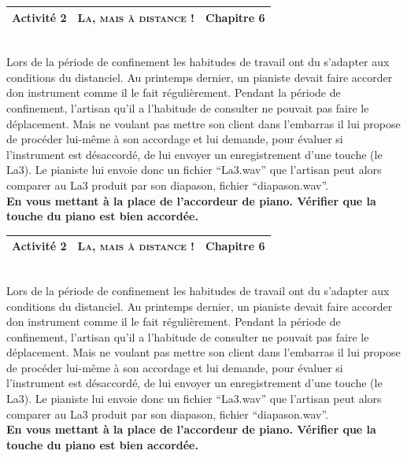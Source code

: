 \documentclass[a4paper,12pt,fleqn]{article}%
\begin{document}
\begin{tabular}{|>{\centering}m{5cm}|>{\centering}m{8cm}|>{\centering\arraybackslash}m{4cm}|}
		\hline
		Activité 2 & \textbf{\textsc{La, mais à distance !}} &  Chapitre 6 \\
		\hline
\end{tabular}\\

Lors de la période de confinement les habitudes de travail ont du s'adapter aux conditions du distanciel. Au printemps dernier, un pianiste devait faire accorder don instrument comme il le fait régulièrement. Pendant la période de confinement, l’artisan qu’il a l’habitude de consulter ne pouvait pas faire le déplacement. Mais ne voulant pas mettre son client dans l’embarras il lui propose de procéder lui-même à son accordage et lui demande, pour évaluer si l’instrument est désaccordé, de lui envoyer un enregistrement d’une touche (le La3). Le pianiste lui envoie donc un fichier “La3.wav” que l’artisan peut alors comparer au La3 produit par son diapason, fichier “diapason.wav”.\\
\textbf{En vous mettant à la place de l’accordeur de piano. Vérifier que la touche du piano est bien accordée.}\\
\vspace{1em}

\begin{tabular}{|>{\centering}m{5cm}|>{\centering}m{8cm}|>{\centering\arraybackslash}m{4cm}|}
		\hline
		Activité 2 & \textbf{\textsc{La, mais à distance !}} &  Chapitre 6 \\
		\hline
\end{tabular}\\

%
Lors de la période de confinement les habitudes de travail ont du s'adapter aux conditions du distanciel. Au printemps dernier, un pianiste devait faire accorder don instrument comme il le fait régulièrement. Pendant la période de confinement, l’artisan qu’il a l’habitude de consulter ne pouvait pas faire le déplacement. Mais ne voulant pas mettre son client dans l’embarras il lui propose de procéder lui-même à son accordage et lui demande, pour évaluer si l’instrument est désaccordé, de lui envoyer un enregistrement d’une touche (le La3). Le pianiste lui envoie donc un fichier “La3.wav” que l’artisan peut alors comparer au La3 produit par son diapason, fichier “diapason.wav”.\\
\textbf{En vous mettant à la place de l’accordeur de piano. Vérifier que la touche du piano est bien accordée.}\\
\end{document}

